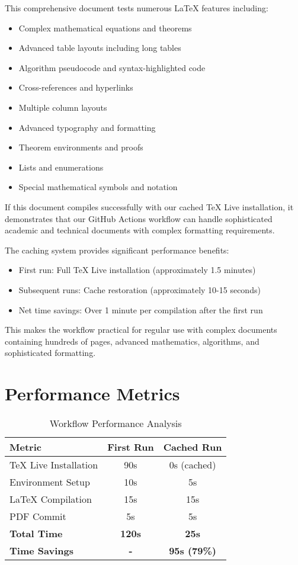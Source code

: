 \documentclass[12pt,a4paper,twoside]{article}
\theoremstyle{definition}
\begin{document}
This comprehensive document tests numerous LaTeX features including:
\begin{itemize}
\item Complex mathematical equations and theorems
\item Advanced table layouts including long tables
\item Algorithm pseudocode and syntax-highlighted code
\item Cross-references and hyperlinks
\item Multiple column layouts
\item Advanced typography and formatting
\item Theorem environments and proofs
\item Lists and enumerations
\item Special mathematical symbols and notation
\end{itemize}

If this document compiles successfully with our cached TeX Live installation, it demonstrates that our GitHub Actions workflow can handle sophisticated academic and technical documents with complex formatting requirements.

The caching system provides significant performance benefits:
\begin{itemize}
\item First run: Full TeX Live installation (approximately 1.5 minutes)
\item Subsequent runs: Cache restoration (approximately 10-15 seconds)
\item Net time savings: Over 1 minute per compilation after the first run
\end{itemize}

This makes the workflow practical for regular use with complex documents containing hundreds of pages, advanced mathematics, algorithms, and sophisticated formatting.

\appendix

\section{Performance Metrics}

\begin{table}[H]
\centering
\caption{Workflow Performance Analysis}
\begin{tabular}{@{}lcc@{}}
\toprule
\textbf{Metric} & \textbf{First Run} & \textbf{Cached Run} \\
\midrule
TeX Live Installation & 90s & 0s (cached) \\
Environment Setup & 10s & 5s \\
LaTeX Compilation & 15s & 15s \\
PDF Commit & 5s & 5s \\
\textbf{Total Time} & \textbf{120s} & \textbf{25s} \\
\textbf{Time Savings} & \textbf{-} & \textbf{95s (79\%)} \\
\bottomrule
\end{tabular}
\end{table}
\end{document}
